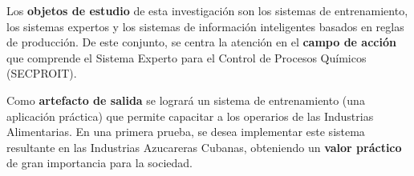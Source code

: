 Los \textbf{objetos de estudio} de esta investigación son los sistemas de entrenamiento, los sistemas expertos y los sistemas de información inteligentes basados en reglas de producción.
De este conjunto, se centra la atención en el \textbf{campo de acción} que comprende el Sistema Experto para el Control de Procesos Químicos (SECPROIT).

Como \textbf{artefacto de salida} se logrará un sistema de entrenamiento (una aplicación práctica) que permite capacitar a los operarios de las Industrias Alimentarias. En una primera prueba, se desea implementar este sistema resultante en las Industrias Azucareras Cubanas, obteniendo un \textbf{valor práctico} de gran importancia para la sociedad.